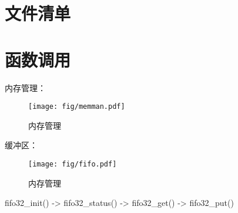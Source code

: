 \chapter{文件清单}

\chapter{函数调用} 

内存管理：\\
\begin{figure}[H]
    \centering
    \texttt{[image: fig/memman.pdf]}
    \caption{内存管理}
    \label{fig:memman}
  \end{figure}

缓冲区：\\
\begin{figure}[H]
    \centering
    \texttt{[image: fig/fifo.pdf]}
    \caption{内存管理}
    \label{fig:fifo}
  \end{figure}
fifo32\_init() 
-> fifo32\_status() 
-> fifo32\_get() 
-> fifo32\_put()
